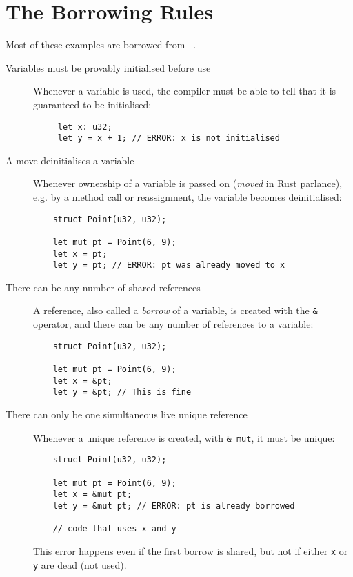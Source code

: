 \documentclass{UUThesisTemplate}
\newcommand{\InRust}[1]{\texttt{#1}}
\begin{document}
\section{The Borrowing Rules}\label{sec:borrowing-rules}



Most of these examples are borrowed from
\citeauthor{weiss_oxide:_2019}~\cite{weiss_oxide:_2019}.

\begin{description}  
\item[Variables must be provably initialised before use] Whenever a variable is
  used, the compiler must be able to tell that it is guaranteed to be
  initialised:
  \begin{verbatim}
     let x: u32;
     let y = x + 1; // ERROR: x is not initialised
  \end{verbatim}
\item[A move deinitialises a variable] Whenever ownership of a variable is
  passed on (\emph{moved} in Rust parlance), e.g. by a method call or
  reassignment, the variable becomes deinitialised:
  \begin{verbatim}
    struct Point(u32, u32);
    
    let mut pt = Point(6, 9);
    let x = pt;
    let y = pt; // ERROR: pt was already moved to x
  \end{verbatim}
\item[There can be any number of shared references] A reference, also called a
  \textit{borrow} of a variable, is created with the \InRust{&} operator, and
  there can be any number of references to a variable:
  \begin{verbatim}
    struct Point(u32, u32);
    
    let mut pt = Point(6, 9);
    let x = &pt;
    let y = &pt; // This is fine
  \end{verbatim}
\item[There can only be one simultaneous live unique reference] Whenever a
  unique reference is created, with \InRust{& mut}, it must be unique:
  \begin{verbatim}
    struct Point(u32, u32);
    
    let mut pt = Point(6, 9);
    let x = &mut pt;
    let y = &mut pt; // ERROR: pt is already borrowed
    
    // code that uses x and y
  \end{verbatim}

  This error happens even if the first borrow is shared, but not if
  either \InRust{x} or \InRust{y} are dead (not used).
  

\end{description}
\end{document}
